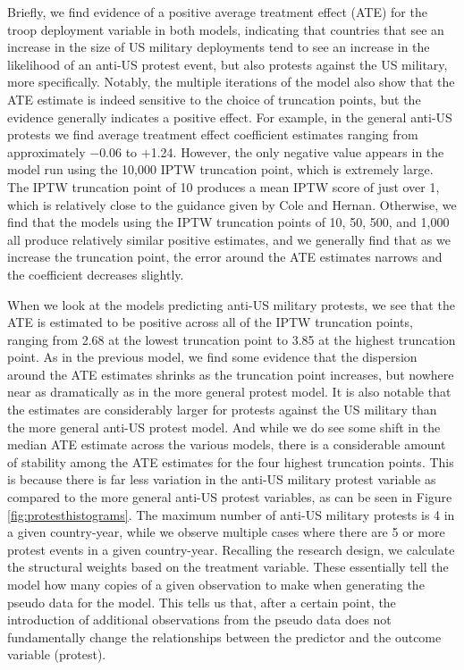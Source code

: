 			Briefly, we find evidence of a positive average treatment effect (ATE) for the troop deployment variable in both models, indicating that countries that see an increase in the size of US military deployments tend to see an increase in the likelihood of an anti-US protest event, but also protests against the US military, more specifically. Notably, the multiple iterations of the model also show that the ATE estimate is indeed sensitive to the choice of truncation points, but the evidence generally indicates a positive effect. For example, in the general anti-US protests we find average treatment effect coefficient estimates ranging from approximately $-$0.06 to $+$1.24. However, the only negative value appears in the model run using the 10,000 IPTW truncation point, which is extremely large. The IPTW truncation point of 10 produces a mean IPTW score of just over 1, which is relatively close to the guidance given by Cole and Hernan.\cite{ColeHernan2008} Otherwise, we find that the models using the IPTW truncation points of 10, 50, 500, and 1,000 all produce relatively similar positive estimates, and we generally find that as we increase the truncation point, the error around the ATE estimates narrows and the coefficient decreases slightly. 
			
			When we look at the models predicting anti-US military protests, we see that the ATE is estimated to be positive across all of the IPTW truncation points, ranging from 2.68 at the lowest truncation point to 3.85 at the highest truncation point. As in the previous model, we find some evidence that the dispersion around the ATE estimates shrinks as the truncation point increases, but nowhere near as dramatically as in the more general protest model. It is also notable that the estimates are considerably larger for protests against the US military than the more general anti-US protest model.  And while we do see some shift in the median ATE estimate across the various models, there is a considerable amount of stability among the ATE estimates for the four highest truncation points. This is because there is far less variation in the anti-US military protest variable as compared to the more general anti-US protest variables, as can be seen in Figure \ref{fig:protesthistograms}. The maximum number of anti-US military protests is 4 in a given country-year, while we observe multiple cases where there are 5 or more protest events in a given country-year. Recalling the research design, we calculate the structural weights based on the treatment variable. These essentially tell the model how many copies of a given observation to make when generating the pseudo data for the model. This tells us that, after a certain point, the introduction of additional observations from the pseudo data does not fundamentally change the relationships between the predictor and the outcome variable (protest).
			
